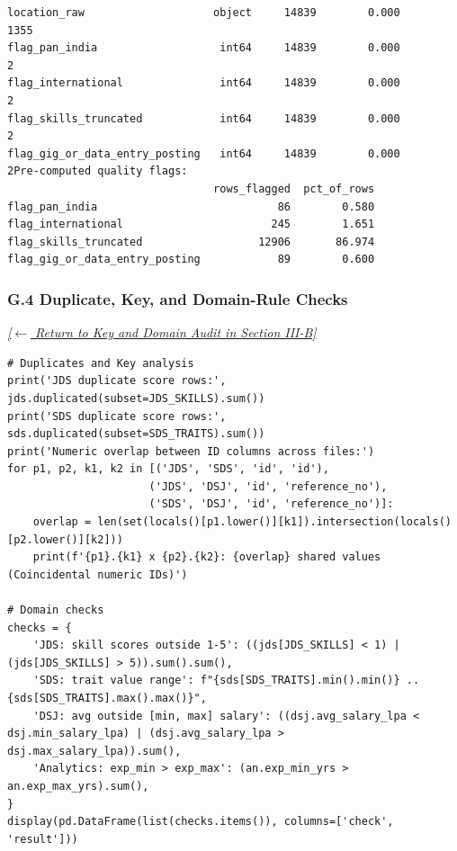 \documentclass[conference]{IEEEtran}
\begin{document}
\begin{lstlisting}[style=outputstyle,caption={Execution Output G.3: Structural Audit and Missingness Logs.},label={out:audit}]
location_raw                    object     14839        0.000      1355
flag_pan_india                   int64     14839        0.000         2
flag_international               int64     14839        0.000         2
flag_skills_truncated            int64     14839        0.000         2
flag_gig_or_data_entry_posting   int64     14839        0.000         2Pre-computed quality flags:
                                rows_flagged  pct_of_rows
flag_pan_india                            86        0.580
flag_international                       245        1.651
flag_skills_truncated                  12906       86.974
flag_gig_or_data_entry_posting            89        0.600
\end{lstlisting}

\subsubsection*{G.4 Duplicate, Key, and Domain-Rule Checks}
\label{lst:domain}
\textit{\hyperref[sec:data_quality]{[$\leftarrow$ Return to Key and Domain Audit in Section III-B]}}

\begin{lstlisting}[style=pythonstyle,caption={Proof that IDs are not relational foreign keys and domain range verification.},label={lst:domain_code}]
# Duplicates and Key analysis
print('JDS duplicate score rows:', jds.duplicated(subset=JDS_SKILLS).sum())
print('SDS duplicate score rows:', sds.duplicated(subset=SDS_TRAITS).sum())
print('Numeric overlap between ID columns across files:')
for p1, p2, k1, k2 in [('JDS', 'SDS', 'id', 'id'),
                      ('JDS', 'DSJ', 'id', 'reference_no'),
                      ('SDS', 'DSJ', 'id', 'reference_no')]:
    overlap = len(set(locals()[p1.lower()][k1]).intersection(locals()[p2.lower()][k2]))
    print(f'{p1}.{k1} x {p2}.{k2}: {overlap} shared values (Coincidental numeric IDs)')

# Domain checks
checks = {
    'JDS: skill scores outside 1-5': ((jds[JDS_SKILLS] < 1) | (jds[JDS_SKILLS] > 5)).sum().sum(),
    'SDS: trait value range': f"{sds[SDS_TRAITS].min().min()} .. {sds[SDS_TRAITS].max().max()}",
    'DSJ: avg outside [min, max] salary': ((dsj.avg_salary_lpa < dsj.min_salary_lpa) | (dsj.avg_salary_lpa > dsj.max_salary_lpa)).sum(),
    'Analytics: exp_min > exp_max': (an.exp_min_yrs > an.exp_max_yrs).sum(),
}
display(pd.DataFrame(list(checks.items()), columns=['check', 'result']))
\end{lstlisting}
\end{document}
